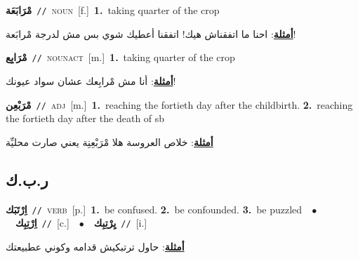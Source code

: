 \documentclass[10pt,a4paper,twoside]{article} %
\begin{document}
\begin{multicols}{2}
{\setlength\topsep{0pt}\textbf{\foreignlanguage{arabic}{مْرَابَعَة}}\ {\color{gray}\texttt{//}\color{black}}\ \textsc{noun}\ [f.]\ \textbf{1.}~taking quarter of the crop\  \begin{flushright}\color{gray}\foreignlanguage{arabic}{\textbf{\underline{\foreignlanguage{arabic}{أمثلة}}}: احنا ما اتفقناش هيك! اتفقنا أعطيك شوي بس مش لدرجة مْرابَعة!}\end{flushright}\color{black}} \vspace{2mm}

{\setlength\topsep{0pt}\textbf{\foreignlanguage{arabic}{مْرَابِع}}\ {\color{gray}\texttt{//}\color{black}}\ \textsc{noun\textunderscore act}\ [m.]\ \textbf{1.}~taking quarter of the crop\  \begin{flushright}\color{gray}\foreignlanguage{arabic}{\textbf{\underline{\foreignlanguage{arabic}{أمثلة}}}: أنا مش مْرابِعك عشان سواد عيونك!}\end{flushright}\color{black}} \vspace{2mm}

{\setlength\topsep{0pt}\textbf{\foreignlanguage{arabic}{مْرَبْعِن}}\ {\color{gray}\texttt{//}\color{black}}\ \textsc{adj}\ [m.]\ \textbf{1.}~reaching the fortieth day after the childbirth.  \textbf{2.}~reaching the fortieth day after the death of sb\  \begin{flushright}\color{gray}\foreignlanguage{arabic}{\textbf{\underline{\foreignlanguage{arabic}{أمثلة}}}: خلاص العروسة هلا مْرَبْعِنِة يعني صارت محليِّة}\end{flushright}\color{black}} \vspace{2mm}

\vspace{-3mm}
\subsection*{\color{blue}\foreignlanguage{arabic}{ر.ب.ك}\color{blue}{}} 

{\setlength\topsep{0pt}\textbf{\foreignlanguage{arabic}{اِرْتَبَك}}\ {\color{gray}\texttt{//}\color{black}}\ \textsc{verb}\ [p.]\ \textbf{1.}~be confused.  \textbf{2.}~be confounded.  \textbf{3.}~be puzzled\ \ $\bullet$\ \ \setlength\topsep{0pt}\textbf{\foreignlanguage{arabic}{اِرْتِبِك}}\ {\color{gray}\texttt{//}\color{black}}\ [c.]\ \ $\bullet$\ \ \setlength\topsep{0pt}\textbf{\foreignlanguage{arabic}{يِرْتِبِك}}\ {\color{gray}\texttt{//}\color{black}}\ [i.]\  \begin{flushright}\color{gray}\foreignlanguage{arabic}{\textbf{\underline{\foreignlanguage{arabic}{أمثلة}}}: حاول ترتبكيش قدامه وكوني عطبيعتك}\end{flushright}\color{black}} \vspace{2mm}


\end{multicols}
\end{document}
